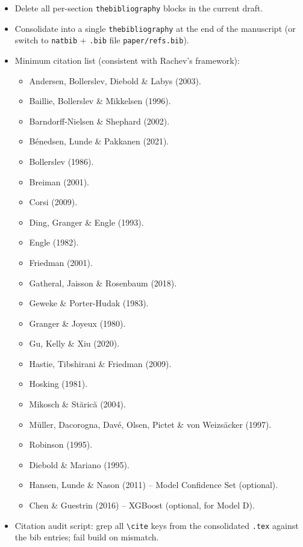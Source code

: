 \documentclass[11pt,a4paper]{article}
\begin{document}
\begin{itemize}
  \item Delete all per-section \texttt{thebibliography} blocks in the
  current draft.
  \item Consolidate into a single \texttt{thebibliography} at the end of
  the manuscript (or switch to \texttt{natbib} + \texttt{.bib} file
  \texttt{paper/refs.bib}).
  \item Minimum citation list (consistent with Rachev's framework):
  \begin{itemize}\small
    \item Andersen, Bollerslev, Diebold \& Labys (2003).
    \item Baillie, Bollerslev \& Mikkelsen (1996).
    \item Barndorff-Nielsen \& Shephard (2002).
    \item B\'enedsen, Lunde \& Pakkanen (2021).
    \item Bollerslev (1986).
    \item Breiman (2001).
    \item Corsi (2009).
    \item Ding, Granger \& Engle (1993).
    \item Engle (1982).
    \item Friedman (2001).
    \item Gatheral, Jaisson \& Rosenbaum (2018).
    \item Geweke \& Porter-Hudak (1983).
    \item Granger \& Joyeux (1980).
    \item Gu, Kelly \& Xiu (2020).
    \item Hastie, Tibshirani \& Friedman (2009).
    \item Hosking (1981).
    \item Mikosch \& St\u aric\u a (2004).
    \item M\"uller, Dacorogna, Dav\'e, Olsen, Pictet \& von Weizs\"acker (1997).
    \item Robinson (1995).
    \item Diebold \& Mariano (1995).
    \item Hansen, Lunde \& Nason (2011) -- Model Confidence Set (optional).
    \item Chen \& Guestrin (2016) -- XGBoost (optional, for Model D).
  \end{itemize}
  \item Citation audit script: grep all \verb|\cite| keys from the
  consolidated \texttt{.tex} against the bib entries; fail build on
  mismatch.
\end{itemize}
\end{document}
